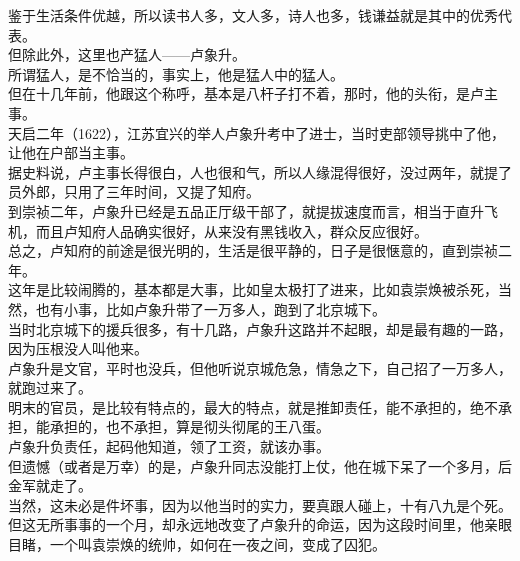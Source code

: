 \begin{multicols}{\theparacolNo}
鉴于生活条件优越，所以读书人多，文人多，诗人也多，钱谦益就是其中的优秀代表。\\

但除此外，这里也产猛人——卢象升。\\

所谓猛人，是不恰当的，事实上，他是猛人中的猛人。\\

但在十几年前，他跟这个称呼，基本是八杆子打不着，那时，他的头衔，是卢主事。\\

天启二年（1622），江苏宜兴的举人卢象升考中了进士，当时吏部领导挑中了他，让他在户部当主事。\\

据史料说，卢主事长得很白，人也很和气，所以人缘混得很好，没过两年，就提了员外郎，只用了三年时间，又提了知府。\\

到崇祯二年，卢象升已经是五品正厅级干部了，就提拔速度而言，相当于直升飞机，而且卢知府人品确实很好，从来没有黑钱收入，群众反应很好。\\

总之，卢知府的前途是很光明的，生活是很平静的，日子是很惬意的，直到崇祯二年。\\

这年是比较闹腾的，基本都是大事，比如皇太极打了进来，比如袁崇焕被杀死，当然，也有小事，比如卢象升带了一万多人，跑到了北京城下。\\

当时北京城下的援兵很多，有十几路，卢象升这路并不起眼，却是最有趣的一路，因为压根没人叫他来。\\

卢象升是文官，平时也没兵，但他听说京城危急，情急之下，自己招了一万多人，就跑过来了。\\

明末的官员，是比较有特点的，最大的特点，就是推卸责任，能不承担的，绝不承担，能承担的，也不承担，算是彻头彻尾的王八蛋。\\

卢象升负责任，起码他知道，领了工资，就该办事。\\

但遗憾（或者是万幸）的是，卢象升同志没能打上仗，他在城下呆了一个多月，后金军就走了。\\

当然，这未必是件坏事，因为以他当时的实力，要真跟人碰上，十有八九是个死。\\

但这无所事事的一个月，却永远地改变了卢象升的命运，因为这段时间里，他亲眼目睹，一个叫袁崇焕的统帅，如何在一夜之间，变成了囚犯。\\


\end{multicols}
